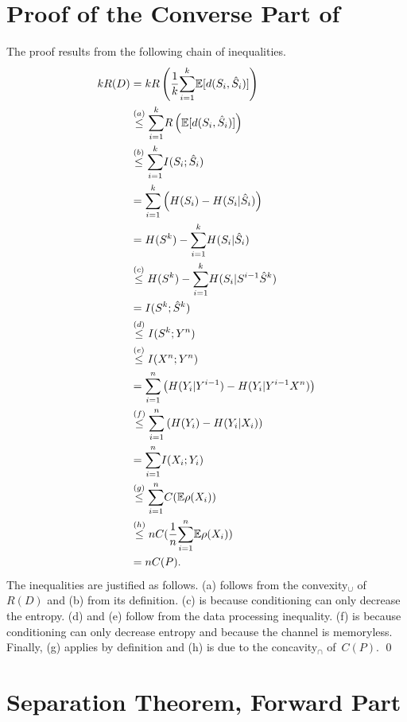 \begin{subappendices}

\section{Proof of the Converse Part of }
\label{app:separationproof}

The proof results from the following chain of inequalities.
{\allowdisplaybreaks
\begin{align*}
  kR(D) &= k R\left(\frac1k {\sum_{i=1}^k} \mathbb{E}[d(S_i, {\hat{S}}_i)] \right) \\
  &\stackrel{(a)}{\le} {\sum_{i=1}^k} R\left(\mathbb{E}[d(S_i, {\hat{S}}_i)] \right) \\
  &\stackrel{(b)}{\le} {\sum_{i=1}^k} I(S_i; {\hat{S}}_i) \\
  &= {\sum_{i=1}^k} \left( H(S_i) - H(S_i|{\hat{S}}_i)  \right)\\
  &= H(S^k) - {\sum_{i=1}^k} H(S_i|{\hat{S}}_i) \\
  &\stackrel{(c)}{\le} H(S^k) - {\sum_{i=1}^k} H(S_i|S^{i-1} {\hat{S}}^k) \\
  &=I(S^k;{\hat{S}}^k) \\
  &\stackrel{(d)}{\le} I(S^k; Y^n) \\
  &\stackrel{(e)}{\le} I(X^n; Y^n) \\
  &= {\sum_{i=1}^n} \left( H(Y_i|Y^{i-1}) - H(Y_i|Y^{i-1} X^n) \right)  \\
  &\stackrel{(f)}{\le} {\sum_{i=1}^n} \left( H(Y_i) - H(Y_i|X_i) \right) \\
  &= {\sum_{i=1}^n} I(X_i; Y_i) \\
  &\stackrel{(g)}{\le} {\sum_{i=1}^n} C(\mathbb{E} \rho(X_i)) \\
  &\stackrel{(h)}{\le} n C(\frac1n {\sum_{i=1}^n} \mathbb{E} \rho(X_i)) \\
  &= n C(P).
\end{align*}}%
The inequalities are justified as follows. (a) follows from the convexity$_\cup$
of~$R(D)$ and (b) from its definition. (c) is because
conditioning can only decrease the entropy. (d) and (e) follow from the data
processing inequality. (f) is because conditioning can only decrease entropy and
because the channel is memoryless. Finally, (g) applies by definition and (h) is
due to the concavity$_\cap$ of~$C(P)$.  \hfil\qed


\section{Separation Theorem, Forward Part}\label{app:separationforward}


\end{subappendices}

